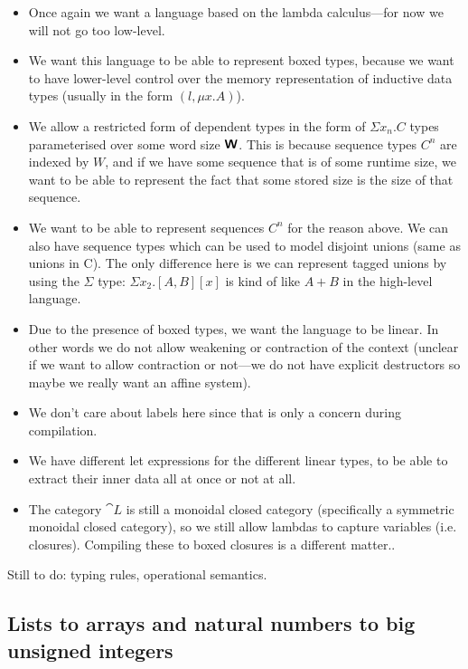 \begin{itemize}
  \item Once again we want a language based on the lambda calculus---for now we will
        not go too low-level.
  \item We want this language to be able to represent boxed types, because we want to
        have lower-level control over the memory representation of inductive data types
        (usually in the form $(l, \mu x . A)$).
  \item We allow a restricted form of dependent types in the form of $\Sigma x_n . C$
        types parameterised over some word size $\textsf{\textbf{W}}$. This is because sequence
        types $C^n$ are indexed by $W$, and if we have some sequence that is of some
        runtime size, we want to be able to represent the fact that some stored size is
        the size of that sequence.
  \item We want to be able to represent sequences $C^n$ for the reason above. We can
        also have sequence types which can be used to model disjoint unions (same as
        unions in C). The only difference here is we can represent tagged unions by
        using the $\Sigma$ type: $\Sigma x_2 . [A, B][x]$ is kind of like $A + B$ in
        the high-level language.
  \item Due to the presence of boxed types, we want the language to be linear. In other
        words we do not allow weakening or contraction of the context (unclear if we
        want to allow contraction or not---we do not have explicit destructors so maybe
        we really want an affine system).
  \item We don't care about labels here since that is only a concern during
        compilation.
  \item We have different let expressions for the different linear types, to be able to
        extract their inner data all at once or not at all.
  \item The category $\cat L$ is still a monoidal closed category (specifically a
        symmetric monoidal closed category), so we still allow lambdas to capture
        variables (i.e. closures). Compiling these to boxed closures is a different
        matter..
\end{itemize}

Still to do: typing rules, operational semantics.

\subsection{Lists to arrays and natural numbers to big unsigned integers}

